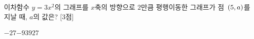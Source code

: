 이차함수 $y=3x^2$의 그래프를 $x$축의 방향으로 $2$만큼 평행이동한 그래프가 점~$(5{,}\mkern3mu a)$를 지날 때, $a$의 값은? \mbox{[3점]}
\begin{choices32}{$-27$}{$-9$}{$3$}{$9$}{$27$}\end{choices32}
